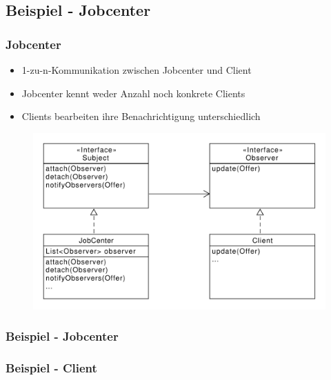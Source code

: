 \subsection{Beispiel - Jobcenter}
\begin{frame}
	\frametitle{Jobcenter}
	\begin{itemize}
		\item 1-zu-n-Kommunikation zwischen Jobcenter und Client 
		\item Jobcenter kennt weder Anzahl noch konkrete Clients
		\item Clients bearbeiten ihre Benachrichtigung unterschiedlich
	\end{itemize}		 
  	\begin{figure}
		\includegraphics[scale=.4]{paper/observer/arbeitsvermittlung}
	\end{figure}
\end{frame}


\begin{frame}
\frametitle{Beispiel - Jobcenter}

\end{frame}

\begin{frame}
\frametitle{Beispiel - Client}
\end{frame}

